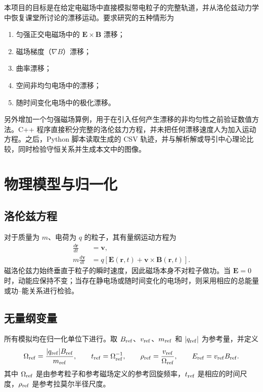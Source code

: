 \documentclass[UTF8,11pt,a4paper]{ctexart}
\newcommand{\vect}[1]{\boldsymbol{#1}}
\begin{document}
本项目的目标是在给定电磁场中直接模拟带电粒子的完整轨道，并从洛伦兹动力学中恢复课堂所讨论的漂移运动。要求研究的五种情形为
\begin{enumerate}[label=\arabic*.]
    \item 匀强正交电磁场中的 $\vect{E}\times\vect{B}$ 漂移；
    \item 磁场梯度（$\nabla B$）漂移；
    \item 曲率漂移；
    \item 空间非均匀电场中的漂移；
    \item 随时间变化电场中的极化漂移。
\end{enumerate}

另外增加一个匀强磁场算例，用于在引入任何产生漂移的非均匀性之前验证数值方法。C++ 程序直接积分完整的洛伦兹力方程，并未把任何漂移速度人为加入运动方程。之后，Python 脚本读取生成的 CSV 轨迹，并与解析解或导引中心理论比较，同时检验守恒关系并生成本文中的图像。

\section{物理模型与归一化}

\subsection{洛伦兹方程}

对于质量为 $m$、电荷为 $q$ 的粒子，其有量纲运动方程为
\begin{align}
    \frac{d\vect{r}}{dt} &= \vect{v}, \\
    m\frac{d\vect{v}}{dt} &= q\left[\vect{E}(\vect{r},t)+\vect{v}\times\vect{B}(\vect{r},t)\right].
    \label{eq:lorentz_dimensional}
\end{align}
磁洛伦兹力始终垂直于粒子的瞬时速度，因此磁场本身不对粒子做功。当 $\vect{E}=0$ 时，动能应保持不变；当存在静电场或随时间变化的电场时，则采用相应的总能量或功--能关系进行检验。

\subsection{无量纲变量}

所有模拟均在归一化单位下进行。取 $B_{\rm ref}$、$v_{\rm ref}$、$m_{\rm ref}$ 和 $|q_{\rm ref}|$ 为参考量，并定义
\begin{equation}
    \Omega_{\rm ref}=\frac{|q_{\rm ref}|B_{\rm ref}}{m_{\rm ref}},
    \qquad
    t_{\rm ref}=\Omega_{\rm ref}^{-1},
    \qquad
    \rho_{\rm ref}=\frac{v_{\rm ref}}{\Omega_{\rm ref}},
    \qquad
    E_{\rm ref}=v_{\rm ref}B_{\rm ref}.
\end{equation}
其中 $\Omega_{\rm ref}$ 是由参考粒子和参考磁场定义的参考回旋频率，$t_{\rm ref}$ 是相应的时间尺度，$\rho_{\rm ref}$ 是参考拉莫尔半径尺度。
\end{document}
